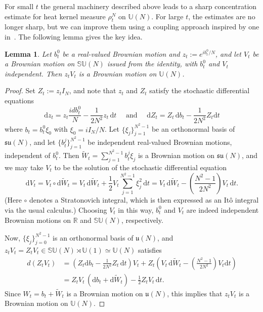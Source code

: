 \documentclass[11pt]{article}
\newtheorem{lemm}[theo]{Lemma}
\theoremstyle{definition}
\numberwithin{equation}{section}
\numberwithin{figure}{section}
\numberwithin{table}{section}
\newcommand{\Unitary}[1]{\mathbb{U}\left(#1\right)}
\newcommand{\SUnitary}[1]{\mathbb{SU}\left(#1\right)}
\newcommand{\R}{\mathbb{R}}
\newcommand*{\dd}{\mathrm{d}}
\newcommand*{\dt}{\dd t}
\newcommand*{\dz}{\dd z}
\newcommand*{\db}{\dd b}
\newcommand*{\dZ}{\dd Z}
\newcommand*{\dV}{\dd V}
\newcommand*{\dtW}{\dd \tilde{W}}
\renewcommand{\tilde}{\widetilde}
\begin{document}
For small $t$ the general machinery described above leads to a sharp concentration estimate for heat kernel measure $\rho^N_t$ on $\Unitary{N}$. For large $t$, the estimates are no longer sharp, but we can improve them using a coupling approach inspired by one in~\cite{MM-ECP-2013}. The following lemma gives the key idea.

\begin{lemm}\label{l.couple}
Let $b^0_t$ be a real-valued Brownian motion and $z_t := e^{ib_t^0/N}$, and let $V_t$ be a Brownian motion on $\SUnitary{N}$ issued from the identity, with $b^0_t$ and $V_t$ independent. Then $z_tV_t$ is a Brownian motion on $\mathbb{U}(N)$.
\end{lemm}

\begin{proof}
Set $Z_t:=z_tI_N$, and note that $z_t$ and $Z_t$ satisfy the stochastic differential equations
\[
\dz_t = z_t \frac{idb_t^0}{N} - \frac{1}{2N^2}z_t\,\dt
\quad \text{ and } \quad \dZ_t = Z_t\,\db_t - \frac{1}{2N^2}Z_t \dt
\]
where $b_t =b_t^0\xi_0$ with $\xi_0=iI_N/N$. Let $\{\xi_j\}_{j=1}^{N^2-1}$ be an orthonormal basis of $\mathfrak{su}(N)$, and let $\{b_t^j\}_{j=1}^{N^2-1}$ be independent real-valued Brownian motions, independent of $b^0_t$. Then $\tilde{W}_t= \sum_{j=1}^{N^2-1} b_t^j \xi_j$ is a Brownian motion on $\mathfrak{su}(N)$, and we may take $V_t$ to be the solution of the stochastic differential equation
\[
\dV_t = V_t\circ \dtW_t = V_t\,\dtW_t + \frac{1}{2}V_t\sum_{j=1}^{N^2-1} \xi_j^2 \,\dt = V_t\,\dtW_t - \left(\frac{N^2-1}{2N^2}\right)V_t\, \dt.
\]
(Here $\circ$ denotes a Stratonovich integral, which is then expressed as an It\^o integral via the usual calculus.) Choosing $V_t$ in this way, $b^0_t$ and $V_t$ are indeed independent Brownian motions on $\R$ and $\SUnitary{N}$, respectively.

Now, $\{\xi_j\}_{j=0}^{N^2-1}$ is an orthonormal basis of $\mathfrak{u}(N)$, and $z_tV_t=Z_tV_t\in \SUnitary{N}\rtimes \mathbb{U}(1)\simeq \mathbb{U}(N)$ satisfies
\begin{align*}
d(Z_tV_t) &= \left(Z_t \db_t - \frac{1}{2N^2} Z_t\,\dt\right)V_t + Z_t\left(V_t\,\dtW_t - \left(\frac{N^2-1}{2N^2}\right)V_t\dt\right)
\\
&= Z_tV_t\,(\db_t +\dtW_t) - \frac{1}{2}Z_tV_t\,\dt.
\end{align*}
Since $W_t=b_t+\tilde{W}_t$ is a Brownian motion on $\mathfrak{u}(N)$, this implies that $z_tV_t$ is a Brownian motion on $\mathbb{U}(N)$.
\end{proof}
\end{document}
